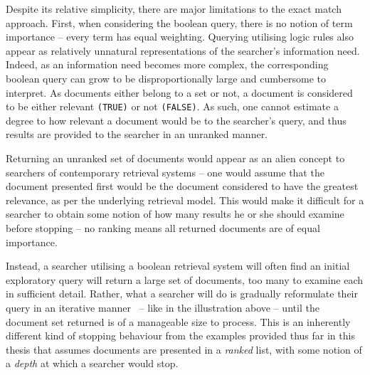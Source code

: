 Despite its relative simplicity, there are major limitations to the exact match approach. First, when considering the boolean query, there is no notion of term importance -- every term has equal weighting. Querying utilising logic rules also appear as relatively unnatural representations of the searcher's information need. Indeed, as an information need becomes more complex, the corresponding boolean query can grow to be disproportionally large and cumbersome to interpret. As documents either belong to a set or not, a document is considered to be either relevant \texttt{(TRUE)} or not \texttt{(FALSE)}. As such, one cannot estimate a degree to how relevant a document would be to the searcher's query, and thus results are provided to the searcher in an unranked manner.

Returning an unranked set of documents would appear as an alien concept to searchers of contemporary retrieval systems -- one would assume that the document presented first would be the document considered to have the greatest relevance, as per the underlying retrieval model. This would make it difficult for a searcher to obtain some notion of how many results he or she should examine before stopping -- no ranking means all returned documents are of equal importance. 

\begin{figure}[h]
    \centering
    \vspace{4mm}
    \label{fig:boolean_reduce}
    \vspace{-5mm}
\end{figure}

Instead, a searcher utilising a boolean retrieval system will often find an initial exploratory query will return a large set of documents, too many to examine each in sufficient detail. Rather, what a searcher will do is gradually reformulate their query in an iterative manner~\citep{koch2009iterative} -- like in the illustration above -- until the document set returned is of a manageable size to process. This is an inherently different kind of stopping behaviour from the examples provided thus far in this thesis that assumes documents are presented in a \emph{ranked} list, with some notion of a \emph{depth} at which a searcher would stop.

